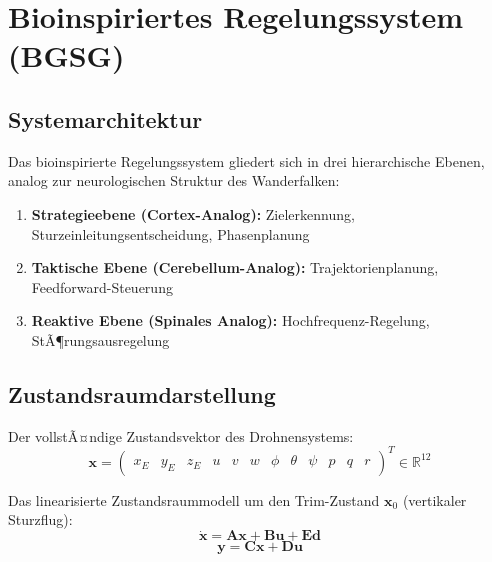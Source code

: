 ﻿\documentclass[12pt,a4paper]{article}
\theoremstyle{remark}
\begin{document}
	\section{Bioinspiriertes Regelungssystem (BGSG)}
	\label{sec:regler}
	
	\subsection{Systemarchitektur}
	
	Das bioinspirierte Regelungssystem gliedert sich in drei hierarchische Ebenen, analog zur neurologischen Struktur des Wanderfalken:
	
	\begin{enumerate}
		\item \textbf{Strategieebene (Cortex-Analog):} Zielerkennung, Sturzeinleitungsentscheidung, Phasenplanung
		\item \textbf{Taktische Ebene (Cerebellum-Analog):} Trajektorienplanung, Feedforward-Steuerung
		\item \textbf{Reaktive Ebene (Spinales Analog):} Hochfrequenz-Regelung, StÃ¶rungsausregelung
	\end{enumerate}
	
	\subsection{Zustandsraumdarstellung}
	
	Der vollstÃ¤ndige Zustandsvektor des Drohnensystems:
	\begin{equation}
		\mathbf{x} = \begin{pmatrix} x_E & y_E & z_E & u & v & w & \phi & \theta & \psi & p & q & r \end{pmatrix}^T \in \mathbb{R}^{12}
	\end{equation}
	
	Das linearisierte Zustandsraummodell um den Trim-Zustand $\mathbf{x}_0$ (vertikaler Sturzflug):
	\begin{equation}
		\dot{\mathbf{x}} = \mathbf{A}\mathbf{x} + \mathbf{B}\mathbf{u} + \mathbf{E}\mathbf{d}
		\label{eq:ss}
	\end{equation}
	\begin{equation}
		\mathbf{y} = \mathbf{C}\mathbf{x} + \mathbf{D}\mathbf{u}
	\end{equation}
	
\end{document}
